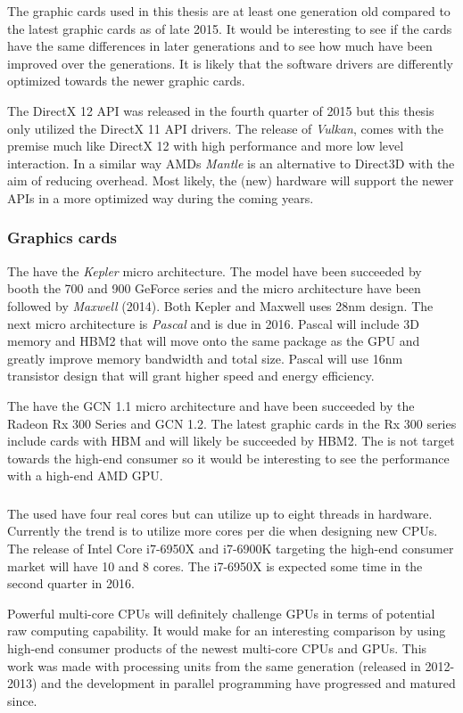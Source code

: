 The graphic cards used in this thesis are at least one generation old compared to the latest graphic cards as of late 2015. It would be interesting to see if the cards have the same differences in later generations and to see how much have been improved over the generations. It is likely that the software drivers are differently optimized towards the newer graphic cards.

The DirectX 12 \gls{API} was released in the fourth quarter of 2015 but this thesis only utilized the DirectX 11 API drivers. The release of \emph{Vulkan}, comes with the premise much like DirectX 12 with high performance and more low level interaction. In a similar way AMDs \emph{Mantle} is an alternative to Direct3D with the aim of reducing overhead. Most likely, the (new) hardware will support the newer APIs in a more optimized way during the coming years.

\subsubsection{Graphics cards}

The {\NVCARD} have the \textit{Kepler} micro architecture. The model have been succeeded by booth the 700 and 900 GeForce series and the micro architecture have been followed by \textit{Maxwell} (2014). Both Kepler and Maxwell uses 28nm design. The next micro architecture is \textit{Pascal} and is due in 2016. Pascal will include 3D memory and \gls{HBM2} that will move onto the same package as the GPU and greatly improve memory bandwidth and total size. Pascal will use 16nm transistor design that will grant higher speed and energy efficiency.

The {\AMDCARD} have the \gls{GCN} 1.1 micro architecture and have been succeeded by the Radeon Rx 300 Series and \gls{GCN} 1.2. The latest graphic cards in the Rx 300 series include cards with \gls{HBM} and will likely be succeeded by \gls{HBM2}. The {\AMDCARD} is not target towards the high-end consumer so it would be interesting to see the performance with a high-end AMD GPU.

\subsubsection{\INTELCPU}

The used {\INTELCPU} have four real cores but can utilize up to eight threads in hardware. Currently the trend is to utilize more cores per die when designing new CPUs. The release of Intel Core i7-6950X and i7-6900K targeting the high-end consumer market will have 10 and 8 cores. The i7-6950X is expected some time in the second quarter in 2016.

Powerful multi-core \gls{CPU}s will definitely challenge GPUs in terms of potential raw computing capability. It would make for an interesting comparison by using high-end consumer products of the newest multi-core CPUs and GPUs. This work was made with processing units from the same generation (released in 2012-2013) and the development in parallel programming have progressed and matured since.